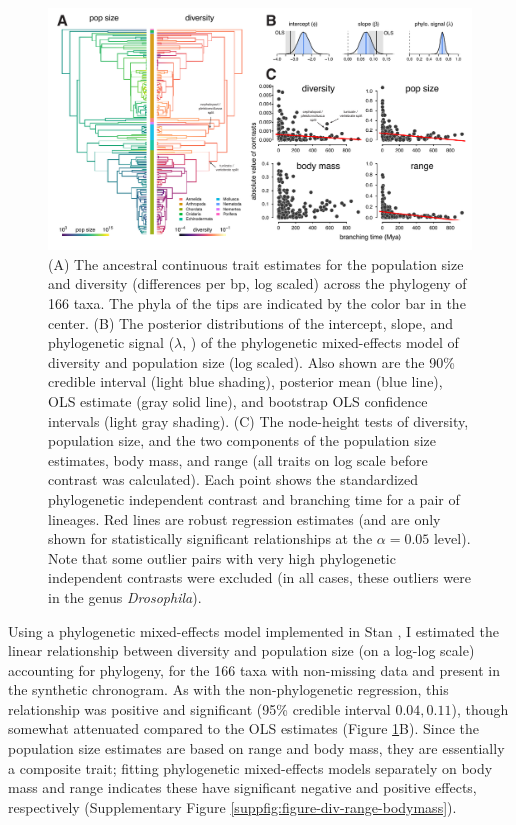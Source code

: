 \documentclass[11pt]{article}
\begin{document}
\begin{figure}[t!]
  \centering
  \includegraphics[width=\textwidth]{figures/diversity_pcm.pdf}

  \caption{(A) The ancestral continuous trait estimates for the population size
    and diversity (differences per bp, log scaled) across the phylogeny of 166
    taxa. The phyla of the tips are indicated by the color bar in the center.
    (B) The posterior distributions of the intercept, slope, and phylogenetic
    signal ($\lambda$, \cite{De_Villemereuil2014-kt}) of the phylogenetic
    mixed-effects model of diversity and population size (log scaled). Also
    shown are the 90\% credible interval (light blue shading), posterior mean
    (blue line), OLS estimate (gray solid line), and bootstrap OLS confidence
    intervals (light gray shading).  (C) The node-height tests of diversity,
    population size, and the two components of the population size estimates,
    body mass, and range (all traits on log scale before contrast was
    calculated). Each point shows the standardized phylogenetic independent
    contrast and branching time for a pair of lineages. Red lines are robust
    regression estimates (and are only shown for statistically significant
    relationships at the $\alpha = 0.05$ level). Note that some outlier pairs
    with very high phylogenetic independent contrasts were excluded (in all
    cases, these outliers were in the genus \emph{Drosophila}).}

  \label{fig:figure-2}
\end{figure}


Using a phylogenetic mixed-effects model
\parencite{Lynch1991-tp,Hadfield2010-ql,De_Villemereuil2014-kt} implemented in
Stan \parencite{Carpenter2017-xi,Stan_Development_Team2020-ea}, I estimated the
linear relationship between diversity and population size (on a log-log scale)
accounting for phylogeny, for the 166 taxa with non-missing data and present in
the synthetic chronogram. As with the non-phylogenetic regression, this
relationship was positive and significant (95\% credible interval $0.04,
0.11$), though somewhat attenuated compared to the OLS estimates (Figure
\ref{fig:figure-2}B). Since the population size estimates are based on range
and body mass, they are essentially a composite trait; fitting phylogenetic
mixed-effects models separately on body mass and range indicates these have
significant negative and positive effects, respectively (Supplementary Figure
\ref{suppfig:figure-div-range-bodymass}).
\end{document}
